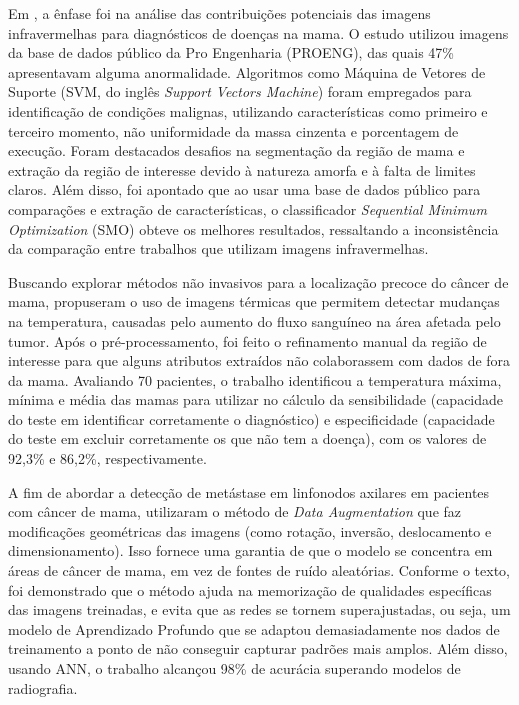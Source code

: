 Em , a ênfase foi na análise das contribuições potenciais das imagens infravermelhas para diagnósticos de doenças na mama. O estudo utilizou imagens da base de dados público da Pro Engenharia (PROENG), das quais 47\% apresentavam alguma anormalidade. Algoritmos como Máquina de Vetores de Suporte (SVM, do inglês \textit{Support Vectors Machine}) foram empregados para identificação de condições malignas, utilizando características como primeiro e terceiro momento, não uniformidade da massa cinzenta e porcentagem de execução. Foram destacados desafios na segmentação da região de mama e extração da região de interesse devido à natureza amorfa e à falta de limites claros. Além disso, foi apontado que ao usar uma base de dados público para comparações e extração de características, o classificador \textit{Sequential Minimum Optimization} (SMO) obteve os melhores resultados,  ressaltando a inconsistência da comparação entre trabalhos que utilizam imagens infravermelhas. 

Buscando explorar métodos não invasivos para a localização precoce do câncer de mama,  propuseram o uso de imagens térmicas que permitem detectar mudanças na temperatura, causadas pelo aumento do fluxo sanguíneo na área afetada pelo tumor. Após o pré-processamento, foi feito o refinamento manual da região de interesse para que alguns atributos extraídos não colaborassem com dados de fora da mama. Avaliando 70 pacientes, o trabalho identificou a temperatura máxima, mínima e média das mamas para utilizar no cálculo da sensibilidade (capacidade do teste em identificar corretamente o diagnóstico) e especificidade (capacidade do teste em excluir corretamente os que não tem a doença), com os valores de 92,3\% e 86,2\%, respectivamente.

A fim de abordar a detecção de metástase em linfonodos axilares em pacientes com câncer de mama,  utilizaram o método de \textit{Data Augmentation} que faz modificações geométricas das imagens (como rotação, inversão, deslocamento e dimensionamento). Isso fornece uma garantia de que o modelo se concentra em áreas de câncer de mama, em vez de fontes de ruído aleatórias. Conforme o texto, foi demonstrado que o método ajuda na memorização de qualidades específicas das imagens treinadas, e evita que as redes se tornem superajustadas, ou seja, um modelo de Aprendizado Profundo que se adaptou demasiadamente nos dados de treinamento a ponto de não conseguir capturar padrões mais amplos. Além disso, usando ANN, o trabalho alcançou 98\% de acurácia superando modelos de radiografia.


